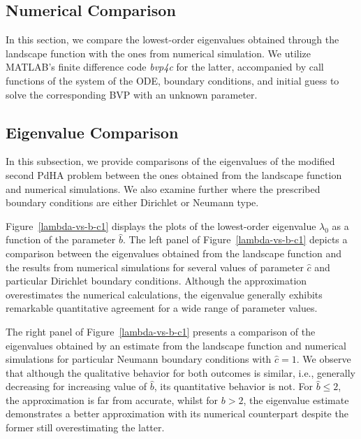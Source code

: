 \documentclass[symmetry,article,accept,moreauthors,pdftex,a4paper]{mdpi}
\begin{document}
\begin{paracol}{2}
\switchcolumn

\vspace{-12pt}

\section{Numerical Comparison}		\label{compare}

In this section, we compare the lowest-order eigenvalues obtained through the landscape function with the ones from numerical simulation. We utilize \textsc{MATLAB}'s finite difference code \emph{bvp4c} for the latter, accompanied by call functions of the system of the ODE, boundary conditions, and initial guess to solve the corresponding BVP with an unknown parameter.  

\subsection{Eigenvalue Comparison}

In this subsection, we provide comparisons of the eigenvalues of the modified second PdHA problem between the ones obtained from the landscape function and numerical simulations. We also examine further where the prescribed boundary conditions are either Dirichlet or Neumann type. 

Figure~\ref{lambda-vs-b-c1} displays the plots of the lowest-order eigenvalue $\lambda_0$ as a function of the parameter $\widehat{b}$. The left panel of Figure~\ref{lambda-vs-b-c1} depicts a comparison between the eigenvalues obtained from the landscape function and the results from numerical simulations for several values of parameter $\widehat{c}$ and particular Dirichlet boundary conditions. Although the approximation overestimates the numerical calculations, the eigenvalue generally exhibits remarkable quantitative agreement for a wide range of parameter values. 

The right panel of Figure~\ref{lambda-vs-b-c1} presents a comparison of the eigenvalues obtained by an estimate from the landscape function and numerical simulations for particular Neumann boundary conditions with $\widehat{c} = 1$. We observe that although the qualitative behavior for both outcomes is similar, i.e., generally decreasing for increasing value of $\widehat{b}$, its quantitative behavior is not. For $\widehat{b} \leq 2$, the approximation is far from accurate, whilst for $b > 2$, the eigenvalue estimate demonstrates a better approximation with its numerical counterpart despite the former still overestimating the latter. 


\end{paracol}
\end{document}
